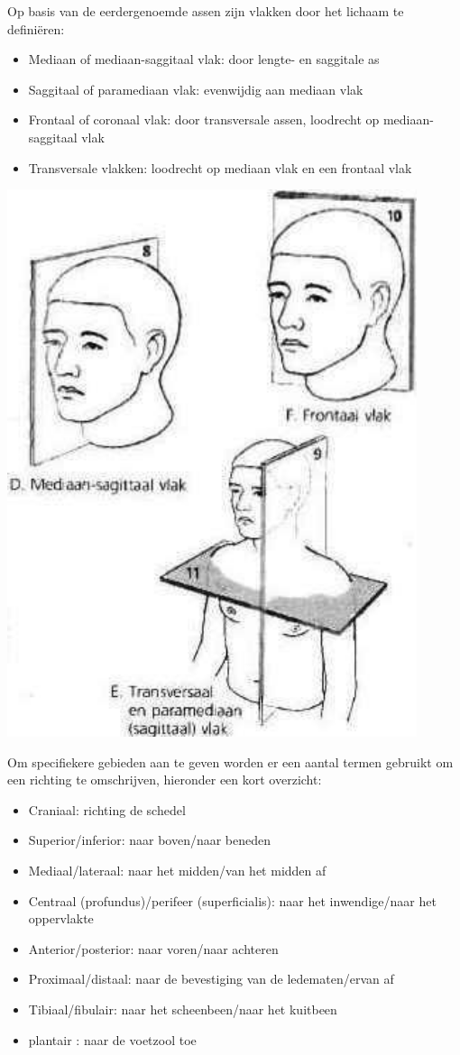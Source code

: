 Op basis van de eerdergenoemde assen zijn vlakken door het lichaam te defini\"{e}ren:
\begin{itemize}
	\item Mediaan of mediaan-saggitaal vlak: door lengte- en saggitale as
	\item Saggitaal of paramediaan vlak: evenwijdig aan mediaan vlak
	\item Frontaal of coronaal vlak: door transversale assen, loodrecht op mediaan-saggitaal vlak
	\item Transversale vlakken: loodrecht op mediaan vlak en een frontaal vlak
\end{itemize}

\includegraphics[width=0.9\textwidth]{sesam}

Om specifiekere gebieden aan te geven worden er een aantal termen gebruikt om een richting te omschrijven, hieronder een kort overzicht:
\begin{itemize}
	\item Craniaal: richting de schedel
	\item Superior/inferior: naar boven/naar beneden
	\item Mediaal/lateraal: naar het midden/van het midden af
	\item Centraal (profundus)/perifeer (superficialis): naar het inwendige/naar het oppervlakte
	\item Anterior/posterior: naar voren/naar achteren
	\item Proximaal/distaal: naar de bevestiging van de ledematen/ervan af
	\item Tibiaal/fibulair: naar het scheenbeen/naar het kuitbeen
	\item plantair : naar de voetzool toe
\end{itemize}

